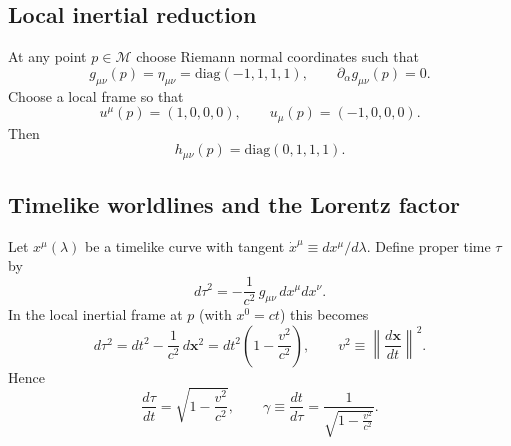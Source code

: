 \documentclass[11pt]{article}
\begin{document}
        \subsection{Local inertial reduction}
            At any point $p\in\mathcal{M}$ choose Riemann normal coordinates such that
            \begin{equation}
                g_{\mu\nu}(p) = \eta_{\mu\nu} = \mathrm{diag}(-1,1,1,1),
                \qquad
                \partial_\alpha g_{\mu\nu}(p)=0.
            \end{equation}
            Choose a local frame so that
            \begin{equation}
                u^\mu(p) = (1,0,0,0),
                \qquad
                u_\mu(p)=(-1,0,0,0).
            \end{equation}
            Then
            \begin{equation}
                h_{\mu\nu}(p)=\mathrm{diag}(0,1,1,1).
            \end{equation}

        \subsection{Timelike worldlines and the Lorentz factor}
            Let $x^\mu(\lambda)$ be a timelike curve with tangent $\dot{x}^\mu \equiv dx^\mu/d\lambda$.
            Define proper time $\tau$ by
            \begin{equation}
                d\tau^2 = -\frac{1}{c^2}\, g_{\mu\nu}\, dx^\mu dx^\nu.
            \end{equation}
            In the local inertial frame at $p$ (with $x^0 = ct$) this becomes
            \begin{equation}
                d\tau^2 = dt^2 - \frac{1}{c^2}\, d\mathbf{x}^2
                = dt^2\left(1-\frac{v^2}{c^2}\right),
                \qquad
                v^2 \equiv \left\lVert \frac{d\mathbf{x}}{dt}\right\rVert^2.
            \end{equation}
            Hence
            \begin{equation}
                \frac{d\tau}{dt} = \sqrt{1-\frac{v^2}{c^2}},
                \qquad
                \gamma \equiv \frac{dt}{d\tau} = \frac{1}{\sqrt{1-\frac{v^2}{c^2}}}.
            \end{equation}
\end{document}
